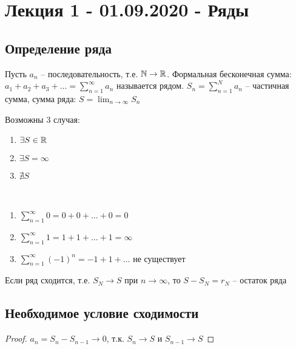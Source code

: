 \section{Лекция 1 - 01.09.2020 - Ряды}
\subsection{Определение ряда}
\begin{definition}
Пусть $a_{n}$ -- последовательность, т.е. $\mathbb{N} \rightarrow \mathbb{R}$. Формальная бесконечная сумма: $a_1 + a_2 + a_3 + \dots = \sum_{n=1}^{\infty} a_n$ называется рядом.
$S_n = \sum_{n = 1}^{N} a_n$ -- частичная сумма, сумма ряда: $S = \lim_{n \rightarrow \infty} S_n$
\end{definition}

Возможны 3 случая:
\begin{enumerate}
    \item $\exists S \in \mathbb{R}$
    \item $\exists S = \infty$
    \item $\nexists S$
\end{enumerate}

\begin{example}~
    \begin{enumerate}
        \item $\sum_{n = 1}^{\infty} 0 = 0 + 0 + \dots + 0 = 0$
        \item $\sum_{n = 1}^{\infty} 1 = 1 + 1 + \dots + 1 = \infty$
        \item $\sum_{n = 1}^{\infty} (-1)^{n} = -1 + 1 + \dots$ не существует
    \end{enumerate}
\end{example}

\begin{definition}
    Если ряд сходится, т.е. $S_N \rightarrow S$ при $n \rightarrow \infty$, то $S - S_N = r_N$ -- остаток ряда
\end{definition}

\subsection{Необходимое условие сходимости}
\begin{comment}~
    Если ряд сходится, то $a_n \rightarrow 0$
\end{comment}
\begin{proof}
    $a_n = S_n - S_{n - 1} \rightarrow 0$, т.к. $S_n \rightarrow S$ и $S_{n - 1} \rightarrow S$
\end{proof}
